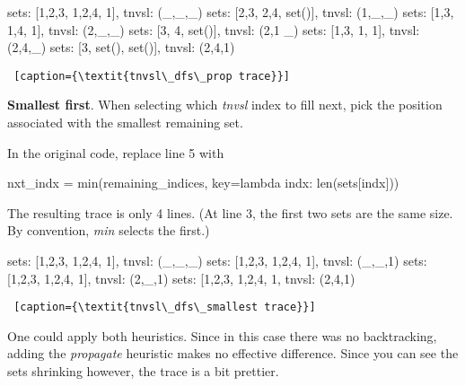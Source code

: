 \begin{flushright}
\begin{minipage}[c]{0.45\textwidth}
\begin{python1}  
sets: [{1,2,3}, {1,2,4}, {1}], tnvsl: (_,_,_)
  sets: [{2,3}, {2,4}, set()], tnvsl: (1,_,_)
  sets: [{1,3}, {1,4}, {1}], tnvsl: (2,_,_)
    sets: [{3}, {4}, set()], tnvsl: (2,1 _)
    sets: [{1,3}, {1}, {1}], tnvsl: (2,4,_)
      sets: [{3}, set(), set()], tnvsl: (2,4,1)
\end{python1}\linv
\begin{lstlisting} [caption={\textit{tnvsl\_dfs\_prop trace}}]
\end{lstlisting}
\end{minipage}
\end{flushright}

\noindent\textbf{Smallest first}. When selecting which \textit{tnvsl} index to fill next, pick the position associated with the smallest remaining set. 

In the original code, replace line 5 with
\begin{center}
\begin{minipage}[c]{0.45\textwidth}
\begin{python1}
 nxt_indx = min(remaining_indices,
                key=lambda indx: len(sets[indx]))
\end{python1}
\end{minipage}
\end{center}
The resulting trace is only 4 lines. (At line 3, the first two sets are the same size. By convention, \textit{min} selects the first.)

\midiumlv 
\begin{center}
\begin{minipage}[c]{0.45\textwidth}
\begin{python1}  
sets: [{1,2,3}, {1,2,4}, {1}], tnvsl: (_,_,_)
  sets: [{1,2,3}, {1,2,4}, {1}], tnvsl: (_,_,1)
    sets: [{1,2,3}, {1,2,4}, {1}], tnvsl: (2,_,1)
      sets: [{1,2,3}, {1,2,4}, {1}, tnvsl: (2,4,1)
\end{python1}\linv
\begin{lstlisting} [caption={\textit{tnvsl\_dfs\_smallest trace}}]
\end{lstlisting}
\end{minipage}
\end{center}

One could apply both heuristics. Since in this case there was no backtracking, adding the \textit{propagate} heuristic makes no effective difference. Since you can see the sets shrinking however, the trace is a bit prettier.

